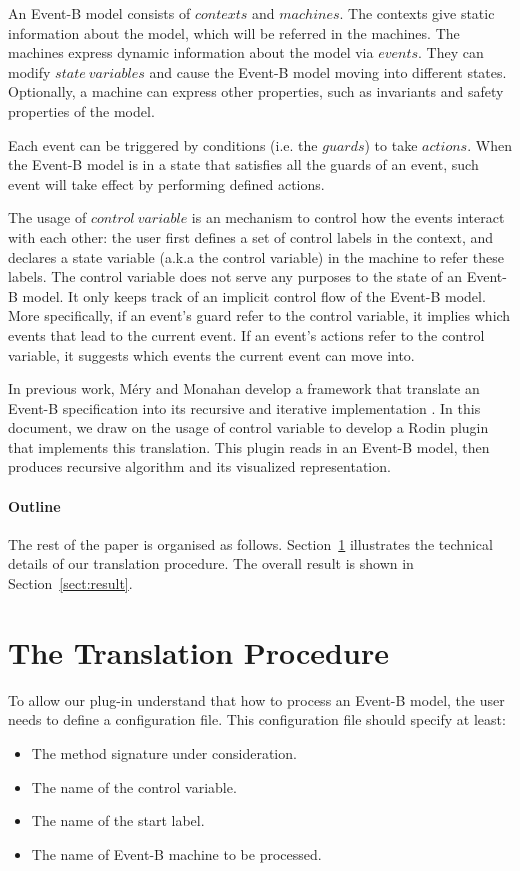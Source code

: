 \documentclass{easychair}
\begin{document}
An Event-B model consists of $contexts$ and $machines$. The contexts give static information about the model, which will be referred in the machines. The machines express dynamic information about the model via $events$. They can modify $state\ variables$ and cause the Event-B model moving into different states. Optionally, a machine can express other properties, such as invariants and safety properties of the model.

Each event can be triggered by conditions (i.e. the $guards$) to take $actions$. When the Event-B model is in a state that satisfies all the guards of an event, such event will take effect by performing defined actions.

The usage of $control\ variable$ is an mechanism to control how the events interact with each other: the user first defines a set of control labels in the context, and declares a state variable (a.k.a the control variable) in the machine to refer these labels. The control variable does not serve any purposes to the state of an Event-B model. It only keeps track of an implicit control flow of the Event-B model. More specifically, if an event's guard refer to the control variable, it implies which events that lead to the current event. If an event's actions refer to the control variable, it suggests which events the current event can move into. 

In previous work, M{\'e}ry and Monahan develop a framework that translate an Event-B specification into its recursive and iterative implementation \cite{Mery2013}. In this document, we draw on the usage of control variable to develop a Rodin plugin that implements this translation. This plugin reads in an Event-B model, then produces recursive algorithm and its visualized representation.

\paragraph{Outline}
The rest of the paper is organised as follows.  
Section~\ref{sect:tp} illustrates the technical details of our translation procedure. 
The overall result is shown in Section~\ref{sect:result}. 

\section{The Translation Procedure}\label{sect:tp}
To allow our plug-in understand that how to process an Event-B model, the user needs to define a configuration file. This configuration file should specify at least:
\begin{itemize}
	\item The method signature under consideration.
	\item The name of the control variable.
	\item The name of the start label.
	\item The name of Event-B machine to be processed.
\end{itemize}
\end{document}
